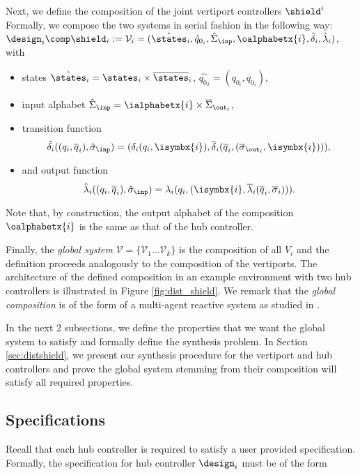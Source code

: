 Next, we define the composition of the joint vertiport controllers $\shield^i$ %
Formally, we compose the two systems in serial fashion in the following way: $\design_i \comp \shield_i := \mathcal V_i =
(\hat{\states}_i, \hat{q}_{0_i}, \hat{\Sigma}_{\inp},\oalphabetx{i}, \hat{\delta}_i,
\hat{\lambda}_i)$, with 
\begin{itemize}
    \item states $\hat{\states}_i = \states_i \times \overline{\states}_i$,
    $\hat{q_{0}}_i = (q_{0_i},\overline{q}_{0_i})$,
    \item input alphabet $\hat{\Sigma}_{\inp} = \ialphabetx{i} \times \overline{\Sigma}_{\out_i}$,
    \item transition function $$\hat{\delta_i}((q_i,\overline{q}_i),\hat{\sigma}_\inp) = (\delta_i(q_i,\isymbx{i}),\overline{\delta}_i(\overline{q}_i,(\overline{\sigma}_{\out_i},\isymbx{i}))),$$
    \item and output function $$\hat{\lambda}_i((q_i,\overline{q}_i),\hat{\sigma}_\inp) = \lambda_i(q_i,(\isymbx{i},\overline{\lambda}_{i}(\overline{q}_i,\overline{\sigma}_{i}))).$$ 
\end{itemize}
   
    
    
   Note that, by construction, the output alphabet of the composition $\oalphabetx{i}$ is the same as that of the hub controller.
   

Finally, the \emph{global system} $ \mathcal V = \{ \mathcal V_1 \dots \mathcal V_k \}$ is the composition of all $V_i$ and the definition proceeds analogously to the composition of the vertiports. The architecture of the defined composition in an example environment with two hub controllers is illustrated in Figure \ref{fig:dist_shield}. We remark that the \emph{global composition} is of the form of a multi-agent reactive system as studied in \cite{multiagentshield}.

In the next 2 subsections, we define the properties that we want the global system to satisfy and formally define the synthesis problem.
In Section \ref{sec:distshield}, we present our synthesis procedure for the vertiport and hub controllers and prove the global system stemming from their composition will satisfy all required properties. 



\subsection{Specifications}\label{sec:specs}
Recall that each hub controller is required to satisfy a user provided specification. Formally, the specification for hub controller $\design_i$ must be of the form 

